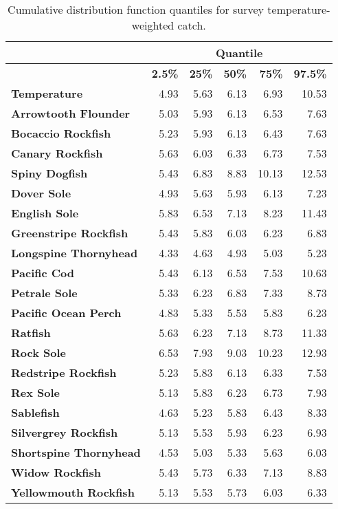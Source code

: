 \documentclass[11pt]{book}\usepackage[]{graphicx}\usepackage[]{color}
\begin{document}
\newpage
\begin{table}[tbp]
\centering
\caption{Cumulative distribution function quantiles for survey temperature-weighted catch.} 
\label{default}
\begingroup\fontsize{9}{10}\selectfont
\begin{tabular}{lrrrrr}
  & \multicolumn{5}{c}{\textbf{Quantile}} \\  \hline
   & \textbf{2.5\%} & \textbf{25\%} & \textbf{50\%} & \textbf{75\%} & \textbf{97.5\%} \\  \hline
\textbf{Temperature} &  4.93 &  5.63 &  6.13 &  6.93 & 10.53 \\ 
  \textbf{Arrowtooth Flounder} &  5.03 &  5.93 &  6.13 &  6.53 &  7.63 \\ 
  \textbf{Bocaccio Rockfish} &  5.23 &  5.93 &  6.13 &  6.43 &  7.63 \\ 
  \textbf{Canary Rockfish} &  5.63 &  6.03 &  6.33 &  6.73 &  7.53 \\ 
  \textbf{Spiny Dogfish} &  5.43 &  6.83 &  8.83 & 10.13 & 12.53 \\ 
  \textbf{Dover Sole} &  4.93 &  5.63 &  5.93 &  6.13 &  7.23 \\ 
  \textbf{English Sole} &  5.83 &  6.53 &  7.13 &  8.23 & 11.43 \\ 
  \textbf{Greenstripe Rockfish} &  5.43 &  5.83 &  6.03 &  6.23 &  6.83 \\ 
  \textbf{Longspine Thornyhead} &  4.33 &  4.63 &  4.93 &  5.03 &  5.23 \\ 
  \textbf{Pacific Cod} &  5.43 &  6.13 &  6.53 &  7.53 & 10.63 \\ 
  \textbf{Petrale Sole} &  5.33 &  6.23 &  6.83 &  7.33 &  8.73 \\ 
  \textbf{Pacific Ocean Perch} &  4.83 &  5.33 &  5.53 &  5.83 &  6.23 \\ 
  \textbf{Ratfish} &  5.63 &  6.23 &  7.13 &  8.73 & 11.33 \\ 
  \textbf{Rock Sole} &  6.53 &  7.93 &  9.03 & 10.23 & 12.93 \\ 
  \textbf{Redstripe Rockfish} &  5.23 &  5.83 &  6.13 &  6.33 &  7.53 \\ 
  \textbf{Rex Sole} &  5.13 &  5.83 &  6.23 &  6.73 &  7.93 \\ 
  \textbf{Sablefish} &  4.63 &  5.23 &  5.83 &  6.43 &  8.33 \\ 
  \textbf{Silvergrey Rockfish} &  5.13 &  5.53 &  5.93 &  6.23 &  6.93 \\ 
  \textbf{Shortspine Thornyhead} &  4.53 &  5.03 &  5.33 &  5.63 &  6.03 \\ 
  \textbf{Widow Rockfish} &  5.43 &  5.73 &  6.33 &  7.13 &  8.83 \\ 
  \textbf{Yellowmouth Rockfish} &  5.13 &  5.53 &  5.73 &  6.03 &  6.33 \\ 
   \hline
\end{tabular}
\endgroup
\end{table}
\end{document}

